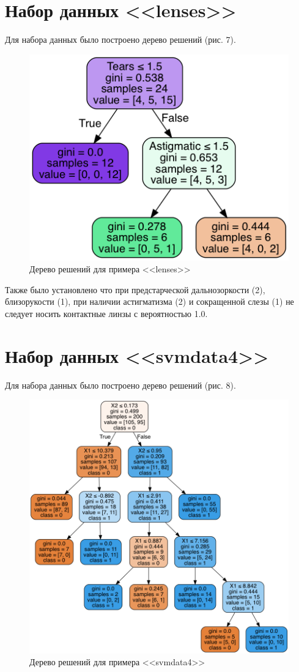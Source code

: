 \documentclass[]{article}
\numberwithin{equation}{section}
\begin{document}
    \section{Набор данных <<lenses>>}

        Для набора данных было построено дерево решений (рис. 7).

        \begin{figure}[H]
            \centering
            \includegraphics[width = 0.7\linewidth]{data/lenses.png}
            \caption{Дерево решений для примера <<lenses>>}
        \end{figure}

        Также было установлено что при предстарческой дальнозоркости (2), близорукости (1), при наличии астигматизма (2) и сокращенной слезы (1) не следует носить контактные линзы с вероятностью 1.0.

    \section{Набор данных <<svmdata4>>}

        Для набора данных было построено дерево решений (рис. 8).

        \begin{figure}[H]
            \centering
            \includegraphics[width = 0.7\linewidth]{data/svmdata.png}
            \caption{Дерево решений для примера <<svmdata4>>}
        \end{figure}
\end{document}
